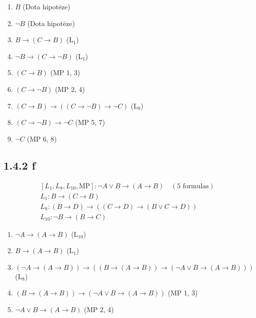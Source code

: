 \documentclass{article}
\begin{document}
\begin{enumerate}
    \item $B$ \hfill (Dota hipotēze)
    \item $\neg B$ \hfill (Dota hipotēze)
    \item $B \rightarrow (C \rightarrow B)$ \hfill (L$_1$)
    \item $\neg B \rightarrow (C \rightarrow \neg B)$ \hfill (L$_1$)
    \item $(C \rightarrow B)$ \hfill (MP 1, 3)
    \item $(C \rightarrow \neg B)$ \hfill (MP 2, 4)
    \item $(C \rightarrow B) \rightarrow ((C \rightarrow \neg B) \rightarrow \neg C)$ \hfill (L$_9$)
    \item $(C \rightarrow \neg B) \rightarrow \neg C$ \hfill (MP 5, 7)
    \item $\neg C$ \hfill (MP 6, 8)
\end{enumerate}

\pagebreak

\subsection{1.4.2 f}

\[
    \begin{array}{l}
        [L_1, L_8, L_{10}, \text{MP}]: \neg A \lor B \rightarrow (A \rightarrow B) \quad (5 \text{ formulas}) \\
        L_1: B \rightarrow (C \rightarrow B)                                                                  \\
        L_8: (B \rightarrow D) \rightarrow ((C \rightarrow D) \rightarrow (B \lor C \rightarrow D))           \\
        L_{10}: \neg B \rightarrow (B \rightarrow C)
    \end{array}
\]

\begin{enumerate}
    \item $\neg A \rightarrow (A \rightarrow B)$ \hfill (L$_{10}$)
    \item $B \rightarrow (A \rightarrow B)$ \hfill (L$_1$)
    \item $(\neg A \rightarrow (A \rightarrow B)) \rightarrow ((B \rightarrow (A \rightarrow B)) \rightarrow (\neg A \lor B \rightarrow (A \rightarrow B)))$ \hfill (L$_8$)
    \item $(B \rightarrow (A \rightarrow B)) \rightarrow (\neg A \lor B \rightarrow (A \rightarrow B))$ \hfill (MP 1, 3)
    \item $\neg A \lor B \rightarrow (A \rightarrow B)$ \hfill (MP 2, 4)
\end{enumerate}
\end{document}
